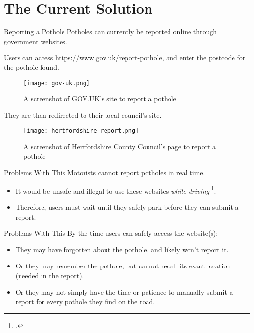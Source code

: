 \documentclass{beamer}
\begin{document}
\section{The Current Solution}

\begin{frame}{Reporting a Pothole}
    Potholes can currently be reported online through government websites.
\end{frame}

\begin{frame}
    Users can access \url{https://www.gov.uk/report-pothole}, and enter the postcode for the pothole found.
    \begin{figure}
        \texttt{[image: gov-uk.png]}
        \caption{A screenshot of GOV.UK's site to report a pothole}
    \end{figure}
\end{frame}

\begin{frame}
    They are then redirected to their local council's site.
    \begin{figure}
        \texttt{[image: hertfordshire-report.png]}
        \caption{A screenshot of Hertfordshire County Council's page to report a pothole}
    \end{figure}
\end{frame}

\begin{frame}{Problems With This}
    Motorists cannot report potholes in real time.
    \begin{itemize}
        \item It would be unsafe and illegal to use these websites \emph{while driving} \footcite{highway-code}.
        \item Therefore, users must wait until they safely park before they can submit a report.
    \end{itemize}
\end{frame}

\begin{frame}{Problems With This}
    By the time users can safely access the website(s):
    \begin{itemize}
        \item They may have forgotten about the pothole, and likely won't report it.
        \item Or they may remember the pothole, but cannot recall its exact location (needed in the report).
        \item Or they may not simply have the time or patience to manually submit a report for every pothole they find on the road.
    \end{itemize}
\end{frame}
\end{document}
